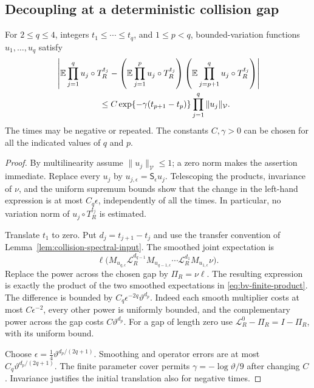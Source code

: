 \subsection{Decoupling at a deterministic collision gap}
\begin{lemma}
\label{lem:bv-finite-product}
For $2\le q\le4$, integers $t_1\le\cdots\le t_q$, and
$1\le p<q$, bounded-variation functions $u_1,\ldots,u_q$ satisfy
\begin{align}
 &\left|\mathbb E\prod_{j=1}^q u_j\circ T_R^{t_j}
 -\left(\mathbb E\prod_{j=1}^p u_j\circ T_R^{t_j}\right)
  \left(\mathbb E\prod_{j=p+1}^q u_j\circ T_R^{t_j}\right)\right|
 \notag\\
 &\hspace{18mm}\le C\exp\{-\gamma(t_{p+1}-t_p)\}
                         \prod_{j=1}^q\|u_j\|_{\mathcal V}.
 \label{eq:bv-finite-product}
\end{align}
The times may be negative or repeated. The constants $C,\gamma>0$
can be chosen for all the indicated values of $q$ and $p$.
\end{lemma}
\begin{proof}
By multilinearity assume $\|u_j\|_{\mathcal V}\le1$; a zero norm
makes the assertion immediate. Replace every $u_j$ by
$u_{j,\epsilon}=\mathsf S_\epsilon u_j$. Telescoping the products,
invariance of $\nu$, and the uniform supremum bounds show that the
change in the left-hand expression is at most $C_q\epsilon$,
independently of all the times. In particular, no variation norm of
$u_j\circ T_R^{t_j}$ is estimated.

Translate $t_1$ to zero. Put $d_j=t_{j+1}-t_j$ and use the transfer
convention of Lemma~\ref{lem:collision-spectral-input}. The smoothed
joint expectation is
\[
 \ell\bigl(M_{u_{q,\epsilon}}\mathcal L_R^{d_{q-1}}
 M_{u_{q-1,\epsilon}}\cdots
 \mathcal L_R^{d_1}M_{u_{1,\epsilon}}\nu\bigr).
\]
Replace the power across the chosen gap by $\Pi_R=\nu\ell$.
The resulting expression is exactly the product of the two smoothed
expectations in \eqref{eq:bv-finite-product}. The difference is bounded
by $C_q\epsilon^{-2q}\vartheta^{d_p}$. Indeed each smooth multiplier
costs at most $C\epsilon^{-2}$, every other power is uniformly bounded,
and the complementary power across the gap costs $C\vartheta^{d_p}$.
For a gap of length zero use
$\mathcal L_R^0-\Pi_R=I-\Pi_R$, with its uniform bound.

Choose $\epsilon=\tfrac14\vartheta^{d_p/(2q+1)}$. Smoothing and
operator errors are at most $C_q\vartheta^{d_p/(2q+1)}$. The finite
parameter cover permits $\gamma=-\log\vartheta/9$ after changing $C$.
Invariance justifies the initial translation also for negative times.
\end{proof}

